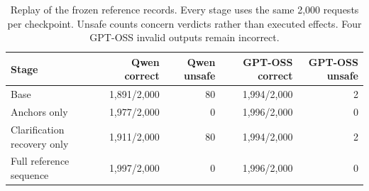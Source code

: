 \begin{table}[htbp]
\centering\footnotesize\setlength{\tabcolsep}{3pt}
\caption{Replay of the frozen reference records. Every stage uses the same 2,000 requests per checkpoint. Unsafe counts concern verdicts rather than executed effects. Four GPT-OSS invalid outputs remain incorrect.}
\label{tab:frozen}
\begin{tabular}{lrrrr}
\toprule
Stage & Qwen correct & Qwen unsafe & GPT-OSS correct & GPT-OSS unsafe \\
\midrule
Base & 1,891/2,000 & 80 & 1,994/2,000 & 2 \\
Anchors only & 1,977/2,000 & 0 & 1,996/2,000 & 0 \\
Clarification recovery only & 1,911/2,000 & 80 & 1,994/2,000 & 2 \\
Full reference sequence & 1,997/2,000 & 0 & 1,996/2,000 & 0 \\
\bottomrule
\end{tabular}
\end{table}
